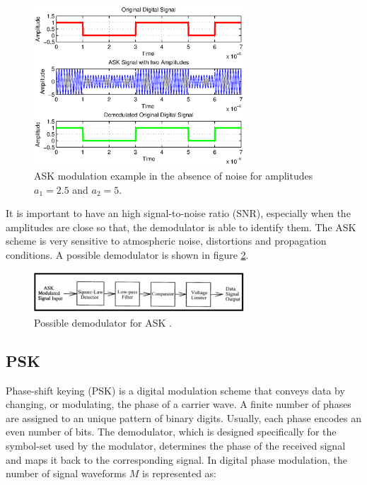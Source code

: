 \documentclass[12pt,a4paper,openright]{report}
\begin{document}
\begin{figure}[H]
  \centering
    \includegraphics[width=0.7\textwidth]{ASKexample.eps}
    \caption[ASK modulation example]{ASK modulation example in the absence of noise for amplitudes $a_1=2.5$ and $a_2=5$.}
    \label{fig:ask}
\end{figure}

It is important to have an high signal-to-noise ratio (SNR), especially when the amplitudes are close so that, the demodulator is able to identify them. The ASK scheme is very sensitive to atmospheric noise, distortions and propagation conditions.  A possible demodulator is shown in figure \ref{fig:askdem}.

\begin{figure}[h]
  \centering
    \includegraphics[width=0.7\textwidth]{askdem.pdf}
    \caption[Possible demodulator for ASK]{Possible demodulator for ASK \cite{ASKDemGaza}.}
    \label{fig:askdem}
\end{figure}


\subsection{PSK}

Phase-shift keying (PSK) is a digital modulation scheme that conveys data by changing, or modulating, the phase of a carrier wave. A finite number of phases are assigned to an unique pattern of binary digits. Usually, each phase encodes an even number of bits. The demodulator, which is designed specifically for the symbol-set used by the modulator, determines the phase of the received signal and maps it back to the corresponding signal. In digital phase modulation, the number of signal waveforms $M$ is represented as: 
\end{document}
